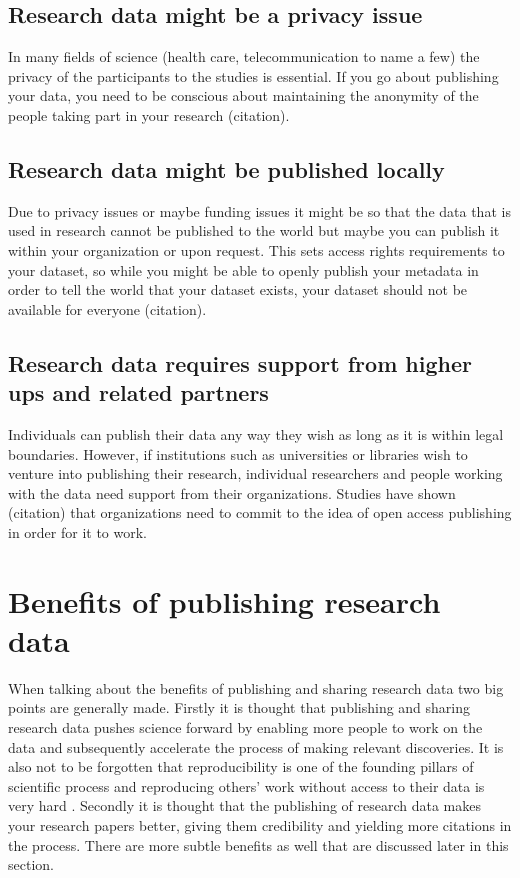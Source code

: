 \subsection{Research data might be a privacy issue}

In many fields of science (health care, telecommunication to name a few) the
privacy of the participants to the studies is essential. If you go about
publishing your data, you need to be conscious about maintaining the anonymity
of the people taking part in your research (citation).

\subsection{Research data might be published locally}

Due to privacy issues or maybe funding issues it might be so that the data
that is used in research cannot be published to the world but maybe you can
publish it within your organization or upon request. This sets access rights
requirements to your dataset, so while you might be able to openly publish
your metadata in order to tell the world that your dataset exists, your dataset
should not be available for everyone (citation). 

\subsection{Research data requires support from higher ups and related partners}

Individuals can publish their data any way they wish as long as it is within
legal boundaries. However, if institutions such as universities or libraries
wish to venture into publishing their research, individual researchers and
people working with the data need support from their organizations. Studies
have shown (citation) that organizations need to commit to the idea of open
access publishing in order for it to work.

\fi

\section{Benefits of publishing research data}
\label{sec:research_data_benefits}

When talking about the benefits of publishing and sharing research data two big
points are generally made. Firstly it is thought that publishing and sharing
research data pushes science forward by enabling more people to work on the
data and subsequently accelerate the process of making relevant discoveries.
It is also not to be forgotten that reproducibility is one of the founding
pillars of scientific process and reproducing others' work without access
to their data is very hard \cite{jasny2011again, peng2011reproducible}.
Secondly it is thought that the publishing of research data makes your
research papers better, giving them credibility and yielding more citations in
the process. There are more subtle benefits as well that are discussed later
in this section.


